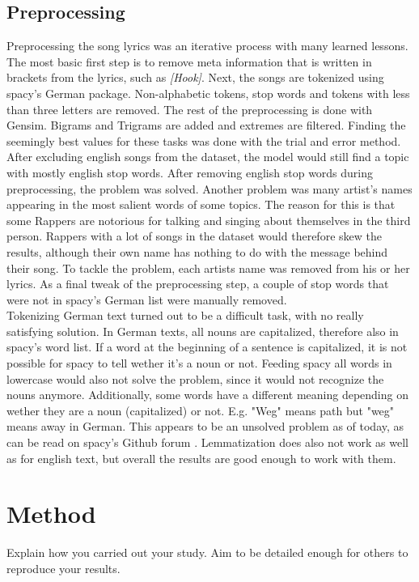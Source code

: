 \documentclass[conference]{IEEEtran}
\begin{document}
\subsection{Preprocessing}
Preprocessing the song lyrics was an iterative process with many learned lessons. The most basic first step is to remove meta information that is written in brackets from the lyrics, such as \textit{[Hook]}. Next, the songs are tokenized using spacy's German package. Non-alphabetic tokens, stop words and tokens with less than three letters are removed. The rest of the preprocessing is done with Gensim. Bigrams and Trigrams are added and extremes are filtered. Finding the seemingly best values for these tasks was done with the trial and error method.\\
After excluding english songs from the dataset, the model would still find a topic with mostly english stop words. After removing english stop words during preprocessing, the problem was solved. Another problem was many artist's names appearing in the most salient words of some topics. The reason for this is that some Rappers are notorious for talking and singing about themselves in the third person. Rappers with a lot of songs in the dataset would therefore skew the results, although their own name has nothing to do with the message behind their song. To tackle the problem, each artists name was removed from his or her lyrics. As a final tweak of the preprocessing step, a couple of stop words that were not in spacy's German list were manually removed.\\
Tokenizing German text turned out to be a difficult task, with no really satisfying solution. In German texts, all nouns are capitalized, therefore also in spacy's word list. If a word at the beginning of a sentence is capitalized, it is not possible for spacy to tell wether it's a noun or not. Feeding spacy all words in lowercase would also not solve the problem, since it would not recognize the nouns anymore. Additionally, some words have a different meaning depending on wether they are a noun (capitalized) or not. E.g. "Weg" means path but "weg" means away in German. This appears to be an unsolved problem as of today, as can be read on spacy's Github forum \cite{spacy_issues}. Lemmatization does also not work as well as for english text, but overall the results are good enough to work with them.

\section{Method}
Explain how you carried out your study. Aim to be detailed enough for
others to reproduce your results.
\end{document}
